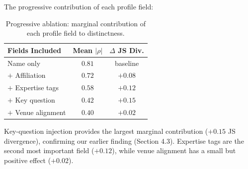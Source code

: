 The progressive contribution of each profile field:

\begin{table}[h]
\centering
\small
\begin{tabular}{lcc}
\toprule
Fields Included & Mean $|\rho|$ & $\Delta$ JS Div. \\
\midrule
Name only & $0.81$ & baseline \\
$+$ Affiliation & $0.72$ & $+0.08$ \\
$+$ Expertise tags & $0.58$ & $+0.12$ \\
$+$ Key question & $0.42$ & $+0.15$ \\
$+$ Venue alignment & $0.40$ & $+0.02$ \\
\bottomrule
\end{tabular}
\caption{Progressive ablation: marginal contribution of each profile field to distinctness.}
\end{table}

\noindent Key-question injection provides the largest marginal contribution ($+0.15$ JS divergence), confirming our earlier finding (Section 4.3). Expertise tags are the second most important field ($+0.12$), while venue alignment has a small but positive effect ($+0.02$).
